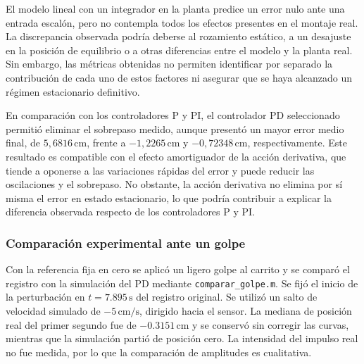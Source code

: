 \documentclass[a4paper, twoside, 10pt, spanish]{article}
\numberwithin{table}{section}
\begin{document}
    El modelo lineal con un integrador en la planta predice un error nulo ante una entrada escalón, pero no contempla todos los efectos presentes en el montaje real. La discrepancia observada podría deberse al rozamiento estático, a un desajuste en la posición de equilibrio o a otras diferencias entre el modelo y la planta real. Sin embargo, las métricas obtenidas no permiten identificar por separado la contribución de cada uno de estos factores ni asegurar que se haya alcanzado un régimen estacionario definitivo.

    En comparación con los controladores P y PI, el controlador PD seleccionado permitió eliminar el sobrepaso medido, aunque presentó un mayor error medio final, de $5{,}6816\,\text{cm}$, frente a $-1{,}2265\,\text{cm}$ y $-0{,}72348\,\text{cm}$, respectivamente. Este resultado es compatible con el efecto amortiguador de la acción derivativa, que tiende a oponerse a las variaciones rápidas del error y puede reducir las oscilaciones y el sobrepaso. No obstante, la acción derivativa no elimina por sí misma el error en estado estacionario, lo que podría contribuir a explicar la diferencia observada respecto de los controladores P y PI.

    \subsubsection{Comparación experimental ante un golpe}
    Con la referencia fija en cero se aplicó un ligero golpe al carrito y se comparó el registro con la simulación del PD mediante \texttt{comparar\_golpe.m}. Se fijó el inicio de la perturbación en $t=7.895\,\text{s}$ del registro original. Se utilizó un salto de velocidad simulado de $-5\,\text{cm/s}$, dirigido hacia el sensor. La mediana de posición real del primer segundo fue de $-0.3151\,\text{cm}$ y se conservó sin corregir las curvas, mientras que la simulación partió de posición cero. La intensidad del impulso real no fue medida, por lo que la comparación de amplitudes es cualitativa.
\end{document}
